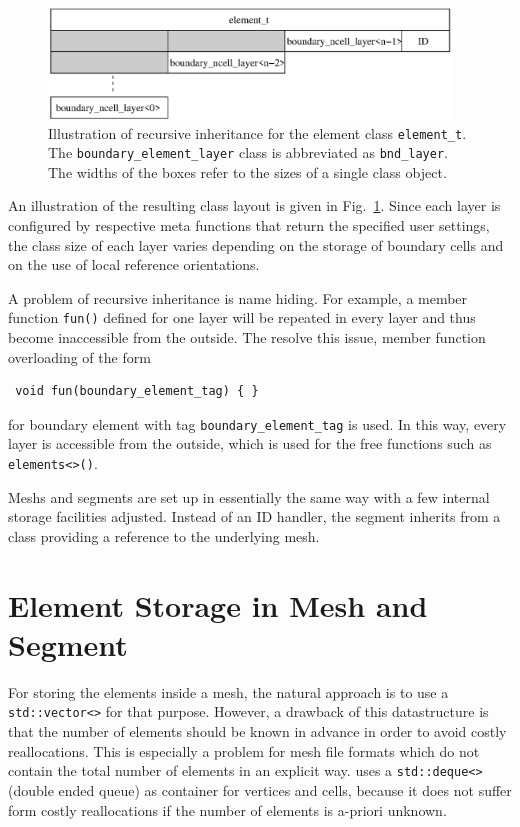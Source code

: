 \begin{figure}[tb]
\centering
 \includegraphics[width=0.95\textwidth]{figures/recursive-inheritance.eps}
 \caption{Illustration of recursive inheritance for the element class \lstinline|element_t|. The \lstinline|boundary_element_layer| class is abbreviated as \lstinline|bnd_layer|. The widths of the boxes refer to the sizes of a single class object.}
 \label{fig:recursive-inheritance}
\end{figure}
An illustration of the resulting class layout is given in Fig.~\ref{fig:recursive-inheritance}.
Since each layer is configured by respective meta functions that return the specified user settings,
the class size of each layer varies depending on the storage of boundary cells and on the use of local reference orientations.

A problem of recursive inheritance is name hiding. For example, a member function \lstinline|fun()| defined for one layer
will be repeated in every layer and thus become inaccessible from the outside. The resolve this issue, member function overloading of the form
\begin{lstlisting}
 void fun(boundary_element_tag) { }
\end{lstlisting}
for boundary element with tag \lstinline|boundary_element_tag| is used. In this way, every layer is accessible from the outside, which is used for the free functions such as \lstinline|elements<>()|.

Meshs and segments are set up in essentially the same way with a few internal storage facilities adjusted.
Instead of an ID handler, the segment inherits from a class providing a reference to the underlying mesh.

\section{Element Storage in Mesh and Segment}
For storing the elements inside a mesh, the natural approach is to use a \lstinline|std::vector<>| for that purpose.
However, a drawback of this datastructure is that the number of elements should be known in advance in order to avoid
costly reallocations. This is especially a problem for mesh file formats which do not contain the total number of elements in an explicit way.
{\ViennaGrid} uses a \lstinline|std::deque<>| (double ended queue) as container for vertices and cells, because it does not suffer form costly reallocations
if the number of elements is a-priori unknown.

